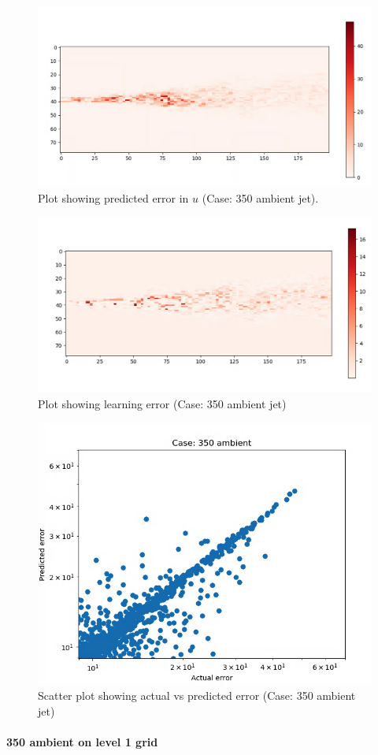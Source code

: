 \documentclass{article}
\begin{document}
\begin{figure}[h!]
    \centering
    \includegraphics[width = 0.8\linewidth]{figures/350_01_pred.png}
    \caption{Plot showing predicted error in $u$ (Case: 350 ambient jet).}
    \label{amr_err}
\end{figure}

\begin{figure}
    \centering
    \includegraphics[width = 0.5\linewidth]{figures/350_01_error.png}
    \caption{Plot showing learning error (Case: 350 ambient jet)}
    \label{amr_err}
\end{figure}

\begin{figure}
    \centering
    \includegraphics[width = 0.6\linewidth]{figures/error_scatter_350_01.png}
    \caption{Scatter plot showing actual vs predicted error (Case: 350 ambient jet)}
    \label{amr_err}
\end{figure}

\paragraph{350 ambient on level 1 grid}
\end{document}
